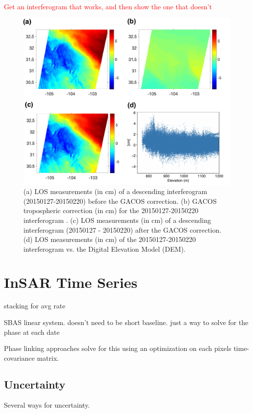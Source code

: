 \documentclass{utexasthesis}
\begin{document}
\textcolor{red}{Get an interferogram that works, and then show the one that doesn't}

\begin{figure}
	\centering
	\includegraphics[width=\textwidth]{paper1-permian/figures/supplement/figureS4-gacos.pdf}		
	\caption[GACOS tropospheric corrections]{(a) LOS measurements (in cm) of a descending interferogram (20150127-20150220) before the GACOS correction. (b) GACOS tropospheric correction (in cm) for the 20150127-20150220 interferogram \citep{Yu2018InterferometricSyntheticAperture}. (c) LOS measurements (in cm) of a descending interferogram (20150127 - 20150220) after the GACOS correction. (d) LOS measurements (in cm) of the 20150127-20150220 interferogram vs. the Digital Elevation Model (DEM).}
	\label{fig:GACOS}
\end{figure}


\section{InSAR Time Series}
\label{sec:ch3-insar-ts}

stacking for avg rate

SBAS linear system. doesn't need to be short baseline. just a way to solve for the phase at each date

Phase linking approaches solve for this using an optimization on each pixels time-covariance matrix.


\subsection{Uncertainty}
\label{sec:ch3-eq-tropo}
Several ways for uncertainty.
\end{document}
